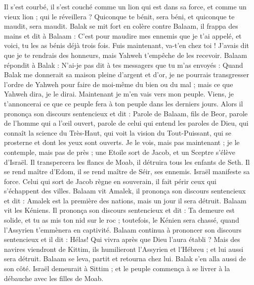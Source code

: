 \begin{multicols}{2}
Il s'est courbé, il s'est couché comme un lion qui est dans sa force, et comme un vieux lion ; qui le réveillera ? Quiconque te bénit, sera béni, et quiconque te maudit, sera maudit.
Balak se mit fort en colère contre Balaam, il frappa des mains et dit à Balaam : C’est pour maudire mes ennemis que je t’ai appelé, et voici, tu les as bénis déjà trois fois.
Fuis maintenant, va-t’en chez toi ! J'avais dit que je te rendrais des honneurs, mais Yahweh t'empêche de les recevoir.
Balaam répondit à Balak : N'ai-je pas dit à tes messagers que tu m’as envoyés :
Quand Balak me donnerait sa maison pleine d'argent et d'or, je ne pourrais transgresser l’ordre de Yahweh pour faire de moi-même du bien ou du mal ; mais ce que Yahweh dira, je le dirai.
Maintenant je m'en vais vers mon peuple. Viens, je t’annoncerai ce que ce peuple fera à ton peuple dans les derniers jours.
Alors il prononça son discours sentencieux et dit : Parole de Balaam, fils de Beor, parole de l'homme qui a l'œil ouvert,
parole de celui qui entend les paroles de Dieu, qui connaît la science du Très-Haut, qui voit la vision du Tout-Puissant, qui se prosterne et dont les yeux sont ouverts.
Je le vois, mais pas maintenant ; je le contemple, mais pas de près ; une Etoile sort de Jacob, et un Sceptre s’élève d’Israël. Il transpercera les flancs de Moab, il détruira tous les enfants de Seth.
Il se rend maître d’Edom, il se rend maître de Séir, ses ennemis. Israël manifeste sa force.
Celui qui sort de Jacob règne en souverain, il fait périr ceux qui s’échappent des villes.
Balaam vit Amalek, il prononça son discours sentencieux et dit : Amalek est la première des nations, mais un jour il sera détruit.
Balaam vit les Kéniens. Il prononça son discours sentencieux et dit : Ta demeure est solide, et tu as mis ton nid sur le roc ;
toutefois, le Kénien sera chassé, quand l’Assyrien t’emmènera en captivité.
Balaam continua à prononcer son discours sentencieux et il dit : Hélas! Qui vivra après que Dieu l’aura établi ?
Mais des navires viendront de Kittim, ils humilieront l’Assyrien et l’Hébreu ; et lui aussi sera détruit.
Balaam se leva, partit et retourna chez lui. Balak s'en alla aussi de son côté.
\VerseOne{}Israël demeurait à Sittim ; et le peuple commença à se livrer à la débauche avec les filles de Moab.

\end{multicols}

